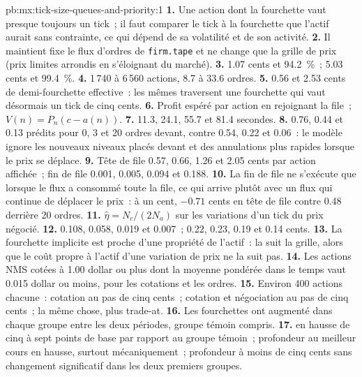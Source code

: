 \begin{solution}{pb:mx:tick-size-queues-and-priority:1}
\textbf{1.} Une action dont la fourchette vaut presque toujours un tick~; il faut comparer le tick à la fourchette que l'actif aurait sans contrainte, ce qui dépend de
sa volatilité et de son activité.
\textbf{2.} Il maintient fixe le flux d'ordres de \texttt{firm.tape} et ne change que la grille de prix (prix limites arrondis en s'éloignant du marché).
\textbf{3.} 1.07 cents et 94.2~\%~; 5.03 cents et 99.4~\%.
\textbf{4.} 1\,740 à 6\,560 actions, 8.7 à 33.6 ordres.
\textbf{5.} 0.56 et 2.53 cents de demi-fourchette effective~: les mêmes  traversent une fourchette qui vaut désormais un tick de cinq cents.
\textbf{6.} Profit espéré par action en rejoignant la file~; $V(n)=P_n(c-a(n))$.
\textbf{7.} 11.3, 24.1, 55.7 et 81.4 secondes.
\textbf{8.} 0.76, 0.44 et 0.13 prédits pour 0, 3 et 20 ordres devant, contre 0.54, 0.22 et 0.06~: le modèle ignore les nouveaux niveaux placés devant et des annulations plus rapides
lorsque le prix se déplace.
\textbf{9.} Tête de file 0.57, 0.66, 1.26 et 2.05 cents par action affichée~; fin de file 0.001, 0.005, 0.094 et 0.188.
\textbf{10.} La fin de file ne s'exécute que lorsque le flux a consommé toute la file, ce qui arrive plutôt avec un flux qui continue de déplacer le prix~: à un cent, $-0.71$ cents
en tête de file contre 0.48 derrière 20 ordres.
\textbf{11.} $\hat\eta=N_c/(2N_a)$ sur les variations d'un tick du prix négocié.
\textbf{12.} 0.108, 0.058, 0.019 et 0.007~; 0.22, 0.23, 0.19 et 0.14 cents.
\textbf{13.} La fourchette implicite est proche d'une propriété de l'actif~: la  suit la grille, alors que le coût propre à l'actif d'une variation de prix ne la suit pas.
\textbf{14.} Les actions NMS cotées à 1.00 dollar ou plus dont la  moyenne pondérée dans le temps vaut 0.015 dollar ou moins, pour les cotations et les ordres.
\textbf{15.} Environ 400 actions chacune~: cotation au pas de cinq cents~; cotation et négociation au pas de cinq cents~; la même chose, plus trade-at.
\textbf{16.} Les fourchettes ont augmenté dans chaque groupe entre les deux périodes, groupe témoin compris.
\textbf{17.}  en hausse de cinq à sept points de base par rapport au groupe témoin~; profondeur au meilleur cours en hausse, surtout mécaniquement~; profondeur à moins de cinq cents sans
changement significatif dans les deux premiers groupes.

\end{solution}
